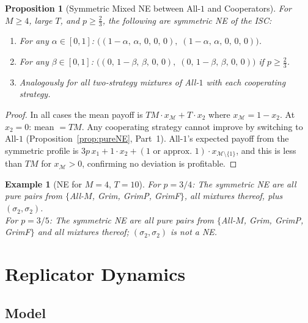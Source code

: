 \documentclass[12pt,a4paper]{article}
\newtheorem{proposition}{Proposition}[section]
\newtheorem{example}{Example}[section]
\begin{document}
\begin{proposition}[Symmetric Mixed NE between All-$1$ and Cooperators]
\label{prop:mixedNE}
For $M\geq 4$, large $T$, and $p\geq\tfrac{2}{3}$, the following
are symmetric NE of the ISC:
\begin{enumerate}
  \item For any $\alpha\in[0,1]$:
        $\bigl((1-\alpha,\,\alpha,\,0,\,0,\,0),\;(1-\alpha,\,\alpha,\,0,\,0,\,0)\bigr)$.
  \item For any $\beta\in[0,1]$:
        $\bigl((0,\,1-\beta,\,\beta,\,0,\,0),\;(0,\,1-\beta,\,\beta,\,0,\,0)\bigr)$
        if $p\geq\tfrac{2}{3}$.
  \item Analogously for all two-strategy mixtures of All-$1$ with each
        cooperating strategy.
\end{enumerate}
\end{proposition}

\begin{proof}
In all cases the mean payoff is $TM\cdot x_{\mathcal{M}} + T\cdot x_2$ where
$x_{\mathcal{M}}=1-x_2$.  At $x_2=0$: mean $=TM$.  Any cooperating strategy
cannot improve by switching to All-$1$ (Proposition~\ref{prop:pureNE}, Part~1).
All-$1$'s expected payoff from the symmetric profile is
$3p\,x_1+1\cdot x_2+(1\text{ or approx. }1)\cdot x_{\mathcal{M}\setminus\{1\}}$,
and this is less than $TM$ for $x_{\mathcal{M}}>0$, confirming no deviation
is profitable.
\end{proof}

\begin{example}[NE for $M=4$, $T=10$]
For $p=3/4$: The symmetric NE are all pure pairs from
$\{$All-$M$, Grim, GrimP, GrimF$\}$, all mixtures thereof,
plus $(\sigma_2,\sigma_2)$.\\
For $p=3/5$: The symmetric NE are all pure pairs from
$\{$All-$M$, Grim, GrimP, GrimF$\}$ and all mixtures thereof;
$(\sigma_2,\sigma_2)$ is \emph{not} a NE.
\end{example}

\section{Replicator Dynamics}
\label{sec:rep}

\subsection{Model}
\end{document}
